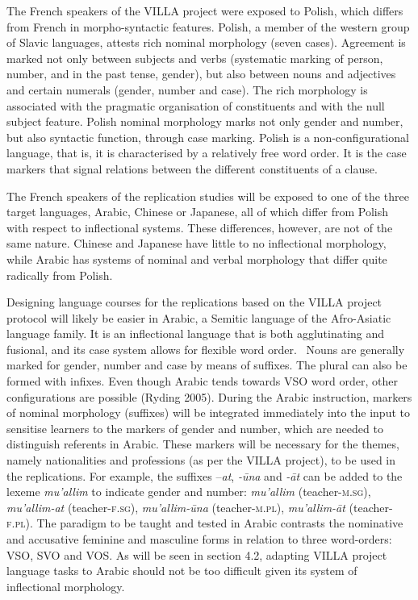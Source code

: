 \documentclass[12pt]{article}
\newenvironment{styleStandard}{\setlength\leftskip{0cm}\setlength\rightskip{0cm plus 1fil}\setlength\parindent{0cm}\setlength\parfillskip{0pt plus 1fil}\setlength\parskip{0cm plus 1pt}\writerlistparindent\writerlistleftskip\leavevmode\normalfont\normalsize\writerlistlabel\ignorespaces}{\unskip\vspace{0cm plus 1pt}\par}
\newcommand\writerlistleftskip{}
\newcommand\writerlistparindent{}
\newcommand\writerlistlabel{}
\begin{document}
\begin{styleStandard}
The French speakers of the VILLA project were exposed to Polish, which differs from French in morpho-syntactic features. Polish, a member of the western group of Slavic languages, attests rich nominal morphology (seven cases). Agreement is marked not only between subjects and verbs (systematic marking of person, number, and in the past tense, gender), but also between nouns and adjectives and certain numerals (gender, number and case). The rich morphology is associated with the pragmatic organisation of constituents and with the null subject feature. Polish nominal morphology marks not only gender and number, but also syntactic function, through case marking. Polish is a non-configurational language, that is, it is characterised by a relatively free word order. It is the case markers that signal relations between the different constituents of a clause.
\end{styleStandard}

\begin{styleStandard}
The French speakers of the replication studies will be exposed to one of the three target languages, Arabic, Chinese or Japanese, all of which differ from Polish with respect to inflectional systems. These differences, however, are not of the same nature. Chinese and Japanese have little to no inflectional morphology, while Arabic has systems of nominal and verbal morphology that differ quite radically from Polish.
\end{styleStandard}

\begin{styleStandard}
Designing language courses for the replications based on the VILLA project protocol will likely be easier in Arabic, a Semitic language of the Afro-Asiatic language family. It is an inflectional language that is both agglutinating and fusional, and its case system allows for flexible word order. \ Nouns are generally marked for gender, number and case by means of suffixes. The plural can also be formed with infixes. Even though Arabic tends towards VSO word order, other configurations are possible (Ryding 2005). During the Arabic instruction, markers of nominal morphology (suffixes) will be integrated immediately into the input to sensitise learners to the markers of gender and number, which are needed to distinguish referents in Arabic. These markers will be necessary for the themes, namely nationalities and professions (as per the VILLA project), to be used in the replications. For example, the suffixes –\textit{at}, \textit{{}-\=una} and \textit{{}-\=at} can be added to the lexeme \textit{mu’allim} to indicate gender and number: \textit{mu’allim }(teacher-\textsc{m.sg}), \textit{mu’allim-at }(teacher-\textsc{f.sg}),\textit{ mu’allim-\=una }(teacher-\textsc{m.pl}), \textit{mu’allim-\=at }(teacher-\textsc{f.pl}). The paradigm to be taught and tested in Arabic contrasts the nominative and accusative feminine and masculine forms in relation to three word-orders: VSO, SVO and VOS. As will be seen in section 4.2, adapting VILLA project language tasks to Arabic should not be too difficult given its system of inflectional morphology.
\end{styleStandard}
\end{document}

